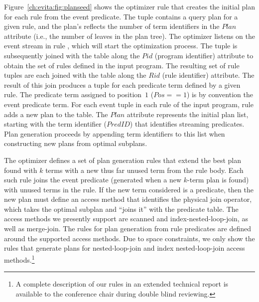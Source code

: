 Figure~\ref{ch:evita:fig:planseed} shows the optimizer rule  that creates
the initial plan for each rule from the event predicate. The  tuple
contains a query plan for a given rule, and the plan's  reflects the number of
term identifiers in the $Plan$ attribute (i.e., the number of leaves in the plan tree). The optimizer listens on the  event stream in
rule , which will start the optimization process.  
The  tuple is subsequently joined with the  table along the 
$Pid$ (program identifier) attribute to obtain the set of rules defined in the input program. 
The resulting set of rule tuples are each joined with the  table along the 
$Rid$ (rule identifier) attribute. The result of this join produces a tuple for each predicate term 
defined by a given rule. The predicate term assigned to position~$1$ ($Pos == 1$) is
by convention the event predicate term.  For each 
event  tuple in each rule of the input program, rule  adds a new 
plan to the  table. The $Plan$ attribute represents the initial plan list,
starting with the term identifier ($PredID$) that identifies streaming predicates.
Plan generation proceeds by appending term identifiers to this list when
constructing new plans from optimal subplans.

The optimizer defines a set of plan generation rules that extend the
best plan found with $k$ terms with a new thus far unused term from the
rule body. Each such rule joins the  event predicate
(generated when a new $k$-term plan is found) with unused terms in the
rule. If the new term considered is a predicate, then the new plan
must define an access method
that identifies the physical join operator, which
takes the optimal subplan and ``joins it'' with the predicate table. The access methods we presently 
support are scanned and index-nested-loop-join, as well as merge-join. 
The rules for plan generation from rule predicates are defined around the supported access methods. 
Due to space constraints, we only show the rules that generate plans for nested-loop-join 
and index nested-loop-join access methods.\footnote{A complete description of our rules 
in an extended technical report is available to the conference chair
during double blind reviewing.}

